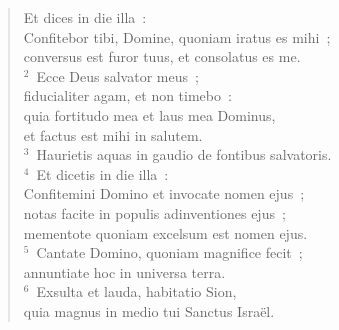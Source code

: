 \begin{flushleft}\begin{verse}\vspace{-19pt}\hspace{6pt}Et dices in die illa~:\\\hspace{6pt} Confitebor tibi, Domine, quoniam iratus es mihi~;\\ conversus est furor tuus, et consolatus es me.\\
${}^{2}$~Ecce Deus salvator meus~;\\ fiducialiter agam, et non timebo~:\\ quia fortitudo mea et laus mea Dominus,\\ et factus est mihi in salutem.\\
${}^{3}$~Haurietis aquas in gaudio de fontibus salvatoris.\\
${}^{4}$~Et dicetis in die illa~:\\ Confitemini Domino et invocate nomen ejus~;\\ notas facite in populis adinventiones ejus~;\\ mementote quoniam excelsum est nomen ejus.\\
${}^{5}$~Cantate Domino, quoniam magnifice fecit~;\\ annuntiate hoc in universa terra.\\
${}^{6}$~Exsulta et lauda, habitatio Sion,\\ quia magnus in medio tui Sanctus Isra\"el.\end{verse}\end{flushleft}



